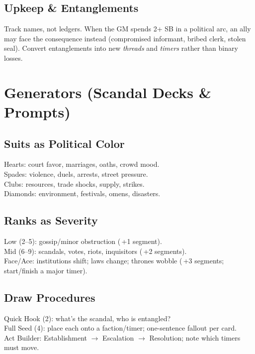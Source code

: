 \documentclass[11pt]{article}
\begin{document}
\subsection*{Upkeep \& Entanglements}
Track names, not ledgers. When the GM spends 2+ SB in a political arc, an ally may face the consequence instead (compromised informant, bribed clerk, stolen seal). Convert entanglements into new \emph{threads} and \emph{timers} rather than binary losses.

\section{Generators (Scandal Decks \& Prompts)}
\subsection*{Suits as Political Color}
Hearts: court favor, marriages, oaths, crowd mood.\\
Spades: violence, duels, arrests, street pressure.\\
Clubs: resources, trade shocks, supply, strikes.\\
Diamonds: environment, festivals, omens, disasters.

\subsection*{Ranks as Severity}
Low (2--5): gossip/minor obstruction (\,+1 segment).\\
Mid (6--9): scandals, votes, riots, inquisitors (\,+2 segments).\\
Face/Ace: institutions shift; laws change; thrones wobble (\,+3 segments; start/finish a major timer).

\subsection*{Draw Procedures}
Quick Hook (2): what's the scandal, who is entangled?\\
Full Seed (4): place each onto a faction/timer; one-sentence fallout per card.\\
Act Builder: Establishment $\to$ Escalation $\to$ Resolution; note which timers must move.
\end{document}
